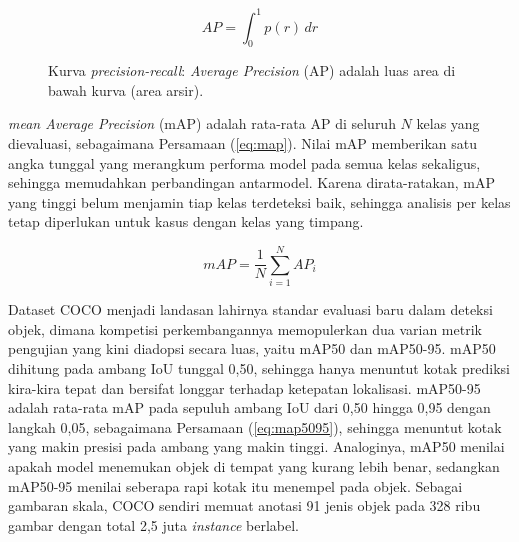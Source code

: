 \begin{equation}
    \mathit{AP} = \int_{0}^{1} p(r)\, dr
    \label{eq:ap}
\end{equation}

\begin{figure}[h]
    \centering
    \caption{Kurva \textit{precision-recall}: \textit{Average Precision} (AP) adalah luas area di bawah kurva (area arsir).}
    \label{fig:pr_curve}
\end{figure}

\textit{mean Average Precision} (mAP) adalah rata-rata AP di seluruh $N$ kelas yang 
dievaluasi, sebagaimana Persamaan (\ref{eq:map}). Nilai mAP memberikan satu angka tunggal 
yang merangkum performa model pada semua kelas sekaligus, sehingga memudahkan perbandingan 
antarmodel. Karena dirata-ratakan, mAP yang tinggi belum menjamin tiap kelas terdeteksi 
baik, sehingga analisis per kelas tetap diperlukan untuk kasus dengan kelas yang timpang.

\begin{equation}
    \mathit{mAP} = \frac{1}{N} \sum_{i=1}^{N} \mathit{AP}_{i}
    \label{eq:map}
\end{equation}

Dataset COCO \cite{lin2014coco} menjadi landasan lahirnya standar evaluasi baru dalam 
deteksi objek, dimana kompetisi perkembangannya memopulerkan dua varian metrik pengujian 
yang kini diadopsi secara luas, yaitu mAP50 dan mAP50-95. mAP50 dihitung pada ambang IoU tunggal 0,50, sehingga 
hanya menuntut kotak prediksi kira-kira tepat dan bersifat longgar terhadap ketepatan 
lokalisasi. mAP50-95 adalah rata-rata mAP pada sepuluh ambang IoU dari 0,50 hingga 0,95 
dengan langkah 0,05, sebagaimana Persamaan (\ref{eq:map5095}), sehingga menuntut kotak yang 
makin presisi pada ambang yang makin tinggi. Analoginya, mAP50 menilai apakah model 
menemukan objek di tempat yang kurang lebih benar, sedangkan mAP50-95 menilai seberapa rapi 
kotak itu menempel pada objek. Sebagai gambaran skala, COCO sendiri memuat anotasi 91 jenis 
objek pada 328 ribu gambar dengan total 2,5 juta \textit{instance} berlabel.

